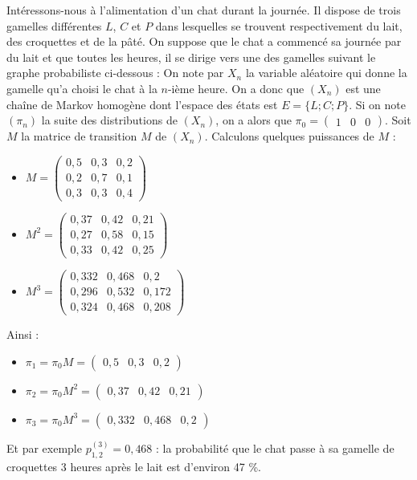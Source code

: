 	\begin{tip}[Exemple]
		Intéressons-nous à l'alimentation d'un chat durant la journée. Il dispose de trois gamelles différentes $L$, $C$ et $P$ dans lesquelles se trouvent respectivement du lait, des croquettes et de la pâté.
		On suppose que le chat a commencé sa journée par du lait et que toutes les heures, il se dirige vers une des gamelles suivant le graphe probabiliste ci-dessous :
		On note par $X_n$ la variable aléatoire qui donne la gamelle qu'a choisi le chat à la $n$-ième heure. On a donc que $(X_n)$ est une chaîne de Markov homogène dont l'espace des états est $E = \{L; C; P\}$. Si on note $(\pi_n)$ la suite des distributions de $(X_n)$, on a alors que $\pi_0 = \begin{pmatrix} 1 & 0 & 0 \end{pmatrix}$.
		\newpar
		Soit $M$ la matrice de transition $M$ de $(X_n)$. Calculons quelques puissances de $M$ :
		\begin{itemize}
			\item $\displaystyle{M = \begin{pmatrix} 0,5 & 0,3 & 0,2 \\ 0,2 & 0,7 & 0,1 \\ 0,3 & 0,3 & 0,4 \end{pmatrix}}$
			\item $\displaystyle{M^2 = \begin{pmatrix} 0,37 & 0,42 & 0,21 \\ 0,27 & 0,58 & 0,15 \\ 0,33 & 0,42 & 0,25 \end{pmatrix}}$
			\item $\displaystyle{M^3 = \begin{pmatrix} 0,332 & 0,468 & 0,2 \\ 0,296 & 0,532 & 0,172 \\ 0,324 & 0,468 & 0,208 \end{pmatrix}}$
		\end{itemize}
		Ainsi :
		\begin{itemize}
			\item $\pi_1 = \pi_0 M = \begin{pmatrix} 0,5 & 0,3 & 0,2 \end{pmatrix}$
			\item $\pi_2 = \pi_0 M^2 = \begin{pmatrix} 0,37 & 0,42 & 0,21 \end{pmatrix}$
			\item $\pi_3 = \pi_0 M^3 = \begin{pmatrix} 0,332 & 0,468 & 0,2 \end{pmatrix}$
		\end{itemize}
		Et par exemple $p_{1,2}^{(3)} = 0,468$ : la probabilité que le chat passe à sa gamelle de croquettes 3 heures après le lait est d'environ 47 \%.
	\end{tip}


